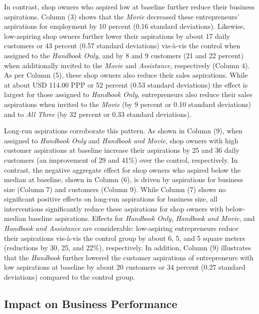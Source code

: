 \documentclass[11.5pt]{article}
\begin{document}
In contrast, shop owners who aspired low at baseline further reduce their business aspirations. Column (3) shows that the \emph{Movie} decreased these entrepreneurs' aspirations for employment by 10 percent (0.16 standard deviations). Likewise, low-aspiring shop owners further lower their aspirations by about 17 daily customers or 43 percent (0.57 standard deviations) vis-\`{a}-vis the control when assigned to the \emph{Handbook Only}, and by 8 and 9 customers (21 and 22 percent) when additionally invited to the \emph{Movie} and \emph{Assistance}, respectively (Column 4). As per Column (5), these shop owners also reduce their sales aspirations. While at about USD 114.00 PPP or 52 percent (0.53 standard deviations) the effect is largest for those assigned to \emph{Handbook Only}, entrepreneurs also reduce their sales aspirations when invited to the \emph{Movie} (by 9 percent or 0.10 standard deviations) and to \emph{All Three} (by 32 percent or 0.33 standard deviations).

Long-run aspirations corroborate this pattern. As shown in Column (9), when assigned to \emph{Handbook Only} and \emph{Handbook and Movie}, shop owners with high customer aspirations at baseline increase their aspirations by 25 and 36 daily customers (an improvement of 29 and 41\%) over the control, respectively. In contrast, the negative aggregate effect for shop owners who aspired below the median at baseline, shown in Column (6), is driven by aspirations for business size (Column 7) and customers (Column 9). While Column (7) shows no significant positive effects on long-run aspirations for business size, all interventions significantly reduce these aspirations for shop owners with below-median baseline aspirations. Effects for \emph{Handbook Only}, \emph{Handbook and Movie}, and \emph{Handbook and Assistance} are considerable: low-aspiring entrepreneurs reduce their aspirations vis-\`{a}-vis the control group by about 6, 5, and 5 square meters (reductions by 30, 25, and 22\%), respectively. In addition, Column (9) illustrates that the \emph{Handbook} further lowered the customer aspirations of entrepreneurs with low aspirations at baseline by about 20 customers or 34 percent (0.27 standard deviations) compared to the control group.


\subsection{Impact on Business Performance}
\end{document}
